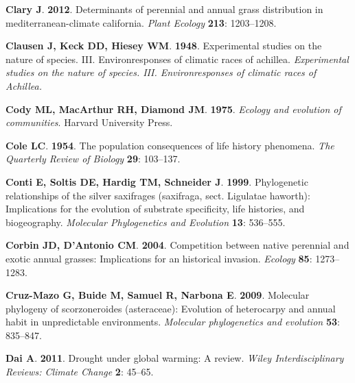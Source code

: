 \documentclass[man,floatsintext]{apa6}
\theoremstyle{definition}
\theoremstyle{definition}
\theoremstyle{definition}
\theoremstyle{remark}
\begin{document}
\leavevmode\hypertarget{ref-clary2012determinants}{}%
\textbf{\textnormal{Clary J}}. \textbf{2012}. Determinants of perennial
and annual grass distribution in mediterranean-climate california.
\emph{Plant Ecology} \textbf{213}: 1203--1208.

\leavevmode\hypertarget{ref-clausen1948experimental}{}%
\textbf{\textnormal{Clausen J}, \textnormal{Keck DD}, \textnormal{Hiesey
WM}}. \textbf{1948}. Experimental studies on the nature of species. III.
Environresponses of climatic races of achillea. \emph{Experimental
studies on the nature of species. III. Environresponses of climatic
races of Achillea.}

\leavevmode\hypertarget{ref-cody1975ecology}{}%
\textbf{\textnormal{Cody ML}, \textnormal{MacArthur RH},
\textnormal{Diamond JM}}. \textbf{1975}. \emph{Ecology and evolution of
communities}. Harvard University Press.

\leavevmode\hypertarget{ref-cole1954population}{}%
\textbf{\textnormal{Cole LC}}. \textbf{1954}. The population
consequences of life history phenomena. \emph{The Quarterly Review of
Biology} \textbf{29}: 103--137.

\leavevmode\hypertarget{ref-conti1999phylogenetic}{}%
\textbf{\textnormal{Conti E}, \textnormal{Soltis DE}, \textnormal{Hardig
TM}, \textnormal{Schneider J}}. \textbf{1999}. Phylogenetic
relationships of the silver saxifrages (saxifraga, sect. Ligulatae
haworth): Implications for the evolution of substrate specificity, life
histories, and biogeography. \emph{Molecular Phylogenetics and
Evolution} \textbf{13}: 536--555.

\leavevmode\hypertarget{ref-corbin2004competition}{}%
\textbf{\textnormal{Corbin JD}, \textnormal{D'Antonio CM}}.
\textbf{2004}. Competition between native perennial and exotic annual
grasses: Implications for an historical invasion. \emph{Ecology}
\textbf{85}: 1273--1283.

\leavevmode\hypertarget{ref-cruz2009molecular}{}%
\textbf{\textnormal{Cruz-Mazo G}, \textnormal{Buide M},
\textnormal{Samuel R}, \textnormal{Narbona E}}. \textbf{2009}. Molecular
phylogeny of scorzoneroides (asteraceae): Evolution of heterocarpy and
annual habit in unpredictable environments. \emph{Molecular
phylogenetics and evolution} \textbf{53}: 835--847.

\leavevmode\hypertarget{ref-dai2011drought}{}%
\textbf{\textnormal{Dai A}}. \textbf{2011}. Drought under global
warming: A review. \emph{Wiley Interdisciplinary Reviews: Climate
Change} \textbf{2}: 45--65.
\end{document}
